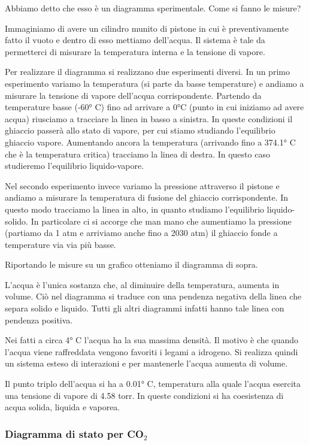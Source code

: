 Abbiamo detto che esso è un diagramma sperimentale. Come si fanno le misure?

Immaginiamo di avere un cilindro munito di pistone in cui è preventivamente fatto il vuoto e dentro di esso mettiamo dell'acqua. Il sistema è tale da permetterci di misurare la temperatura interna e la tensione di vapore.

Per realizzare il diagramma si realizzano due esperimenti diversi. In un primo esperimento variamo la temperatura (si parte da basse temperature) e andiamo a misurare la tensione di vapore dell'acqua corrispondente. Partendo da temperature basse (-60° C) fino ad arrivare a 0°C (punto in cui iniziamo ad avere acqua) riusciamo a tracciare la linea in basso a sinistra. In queste condizioni il ghiaccio passerà allo stato di vapore, per cui stiamo studiando l'equilibrio ghiaccio vapore. Aumentando ancora la temperatura (arrivando fino a 374.1° C che è la temperatura critica) tracciamo la linea di destra. In questo caso studieremo l'equilibrio liquido-vapore.

Nel secondo esperimento invece variamo la pressione attraverso il pistone e andiamo a misurare la temperatura di fusione del ghiaccio corrispondente. In questo modo tracciamo la linea in alto, in quanto studiamo l'equilibrio liquido-solido. In particolare ci si accorge che man mano che aumentiamo la pressione (partiamo da 1 atm e arriviamo anche fino a 2030 atm) il ghiaccio fonde a temperature via via più basse.

Riportando le misure su un grafico otteniamo il diagramma di sopra.

L'acqua è l'unica sostanza che, al diminuire della temperatura, aumenta in volume. Ciò nel diagramma si traduce con una pendenza negativa della linea che separa solido e liquido. Tutti gli altri diagrammi infatti hanno tale linea con pendenza positiva.

Nei fatti a circa 4° C l'acqua ha la sua massima densità. Il motivo è che quando l'acqua viene raffreddata vengono favoriti i legami a idrogeno. Si realizza quindi un sistema esteso di interazioni e per mantenerle l'acqua aumenta di volume.

Il punto triplo dell'acqua si ha a 0.01° C, temperatura alla quale l'acqua esercita una tensione di vapore di 4.58 torr. In queste condizioni si ha coesistenza di acqua solida, liquida e vaporea.
\subsubsection{Diagramma di stato per CO$_2$}

